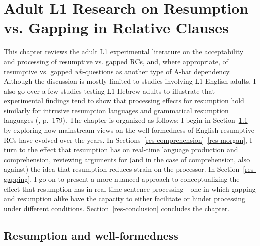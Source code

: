 

\chapter{Adult L1 Research on Resumption vs. Gapping in Relative Clauses}\label{ch-resumption}


This chapter reviews the adult L1 experimental literature on the acceptability and processing of resumptive vs. gapped RCs, and, where appropriate, of resumptive vs. gapped \textit{wh}-questions as another type of A-bar dependency. Although the discussion is mostly limited to studies involving L1-English adults, I also go over a few studies testing L1-Hebrew adults to illustrate that experimental findings tend to show that processing effects for resumption hold similarly for intrusive resumption languages and grammatical resumption languages (\cite{meltzer-asscher2021}, p.~179).\footnotemark{} The chapter is organized as follows: I begin in Section~\ref{res-wellformedness} by exploring how mainstream views on the well-formedness of English resumptive RCs have evolved over the years. In Sections~\ref{res-comprehension}--\ref{res-morgan}, I turn to the effect that resumption has on real-time language production and comprehension, reviewing arguments for (and in the case of comprehension, also against) the idea that resumption reduces strain on the processor. In Section~\ref{res-gapping}, I go on to present a more nuanced approach to conceptualizing the effect that resumption has in real-time sentence processing---one in which gapping and resumption alike have the capacity to either facilitate or hinder processing under different conditions. Section~\ref{res-conclusion} concludes the chapter.


\section{Resumption and well-formedness}\label{res-wellformedness}


